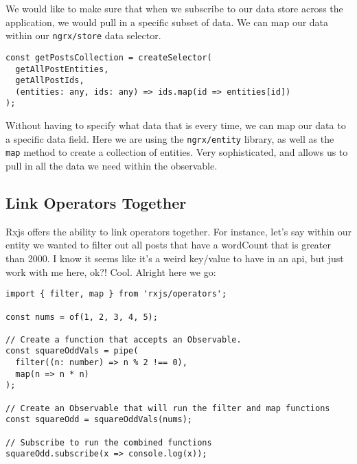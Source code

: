 We would like to make sure that when we subscribe to our data store 
across the application, we would pull in a specific subset of data. We can map 
our data within our \lstinline{ngrx/store} data selector. 

\begin{lstlisting}[caption=settings.selector.ts]
const getPostsCollection = createSelector(
  getAllPostEntities,
  getAllPostIds,
  (entities: any, ids: any) => ids.map(id => entities[id])
);
\end{lstlisting}

Without having to specify what data that is every time, we can map our data 
to a specific data field. Here we are using the \lstinline{ngrx/entity} 
library, as well as the \lstinline{map} method to create a collection of 
entities. Very sophisticated, and allows us to pull in all the data we need
within the observable.

\subsection{Link Operators Together}
Rxjs offers the ability to link operators together. For instance, let's say 
within our entity we wanted to filter out all posts that have a wordCount 
that is greater than 2000. I know it seems like it's a weird key/value to have 
in an api, but just work with me here, ok?! Cool. Alright here we go: 
\begin{lstlisting}
import { filter, map } from 'rxjs/operators';

const nums = of(1, 2, 3, 4, 5);

// Create a function that accepts an Observable.
const squareOddVals = pipe(
  filter((n: number) => n % 2 !== 0),
  map(n => n * n)
);

// Create an Observable that will run the filter and map functions
const squareOdd = squareOddVals(nums);

// Subscribe to run the combined functions
squareOdd.subscribe(x => console.log(x));  
\end{lstlisting}


